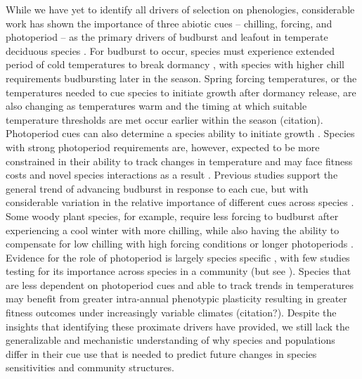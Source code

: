 \documentclass{article}\usepackage[]{graphicx}\usepackage[]{color}
\begin{document}
While we have yet to identify all drivers of selection on phenologies, considerable work has shown the importance of three abiotic cues -- chilling, forcing, and photoperiod -- as the primary drivers of budburst and leafout in temperate deciduous species \citep{Basler2014,Chuine2016, Harrington2016,Flynn2018}. For budburst to occur, species must experience extended period of cold temperatures to break dormancy \citep{Cooke2012}, with species with higher chill requirements budbursting later in the season. Spring forcing temperatures, or the temperatures needed to cue species to initiate growth after dormancy release, are also changing as temperatures warm and the timing at which suitable temperature thresholds are met occur earlier within the season (citation). Photoperiod cues can also determine a species ability to initiate growth \citep{Basler2014,Zohner2020}. Species with strong photoperiod requirements are, however, expected to be more constrained in their ability to track changes in temperature and may face fitness costs and novel species interactions as a result \citep{Guy2014, others?}. Previous studies support the general trend of advancing budburst in response to each cue, but with considerable variation in the relative importance of different cues across species \citep{Chuine2016,Flynn2018}. Some woody plant species, for example, require less forcing to budburst after experiencing a cool winter with more chilling, while also having the ability to compensate for low chilling with high forcing conditions or longer photoperiods \citep{Laube2014,Harrington2015,Flynn2018,Caffarra2011,Basler2014,Zohner2016}. Evidence for the role of photoperiod is largely species specific  \citep{Heide1993, Basler2014, Singh2017, Zohner2016}, with few studies testing for its importance across species in a community (but see  \cite{Flynn2018}). Species that are less dependent on photoperiod cues and able to track trends in temperatures may benefit from greater intra-annual phenotypic plasticity resulting in greater fitness outcomes under increasingly variable climates (citation?). Despite the insights that identifying these proximate drivers have provided, we still lack the generalizable and mechanistic understanding of why species and populations differ in their cue use that is needed to predict future changes in species sensitivities and community structures.
\end{document}
